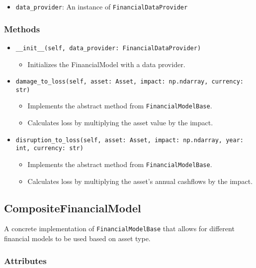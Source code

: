 \documentclass{article}
\begin{document}
\begin{itemize}
    \item \texttt{data\_provider}: An instance of \texttt{FinancialDataProvider}
\end{itemize}

\subsubsection{Methods}

\begin{itemize}
    \item \texttt{\_\_init\_\_(self, data\_provider: FinancialDataProvider)}
    \begin{itemize}
        \item Initializes the FinancialModel with a data provider.
    \end{itemize}

    \item \texttt{damage\_to\_loss(self, asset: Asset, impact: np.ndarray, currency: str)}
    \begin{itemize}
        \item Implements the abstract method from \texttt{FinancialModelBase}.
        \item Calculates loss by multiplying the asset value by the impact.
    \end{itemize}

    \item \texttt{disruption\_to\_loss(self, asset: Asset, impact: np.ndarray, year: int, currency: str)}
    \begin{itemize}
        \item Implements the abstract method from \texttt{FinancialModelBase}.
        \item Calculates loss by multiplying the asset's annual cashflows by the impact.
    \end{itemize}
\end{itemize}

\subsection{CompositeFinancialModel}

A concrete implementation of \texttt{FinancialModelBase} that allows for different financial models to be used based on asset type.

\subsubsection{Attributes}
\end{document}
